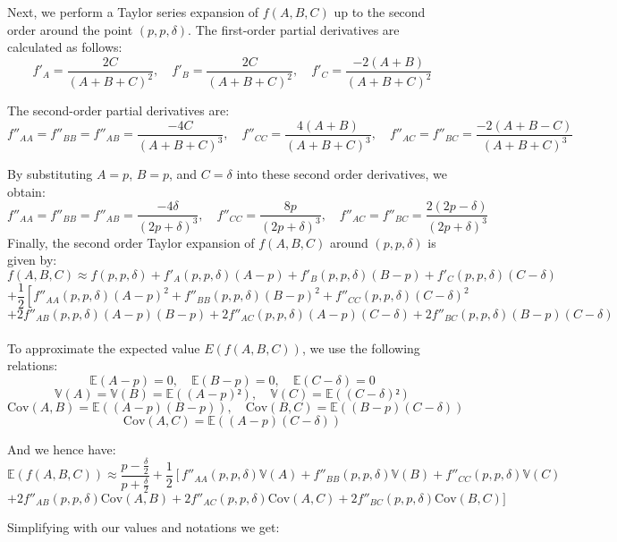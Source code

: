 Next, we perform a Taylor series expansion of \(f(A,B,C)\) up to the second order around the point \((p, p, \delta)\). The first-order partial derivatives are calculated as follows:
\[
f'_A = \frac{2C}{(A + B + C)^2}, \quad f'_B = \frac{2C}{(A + B + C)^2}, \quad f'_C = \frac{-2(A + B)}{(A + B + C)^2}
\]

The second-order partial derivatives are:
\[
f''_{AA} = f''_{BB} = f''_{AB} = \frac{-4C}{(A + B + C)^3}, \quad f''_{CC} = \frac{4(A + B)}{(A + B + C)^3}, \quad f''_{AC} = f''_{BC} = \frac{-2(A + B - C)}{(A + B + C)^3}
\]

By substituting \(A = p\), \(B = p\), and \(C = \delta\) into these second order derivatives, we obtain:
\[
f''_{AA} = f''_{BB} = f''_{AB} = \frac{-4\delta}{(2p + \delta)^3}, \quad f''_{CC} = \frac{8p}{(2p + \delta)^3}, \quad f''_{AC} = f''_{BC} = \frac{2(2p - \delta)}{(2p + \delta)^3}
\]
Finally, the second order Taylor expansion of \(f(A,B,C)\) around \((p,p,\delta)\) is given by:
\[
f(A,B,C) \approx f(p,p,\delta) + f'_A(p,p,\delta)(A - p) + f'_B(p,p,\delta)(B - p) + f'_C(p,p,\delta)(C - \delta)
\]
\[
+ \frac{1}{2} \left[ f''_{AA}(p,p,\delta)(A - p)^2 + f''_{BB}(p,p,\delta)(B - p)^2 + f''_{CC}(p,p,\delta)(C - \delta)^2 \right.
\]
\[
+ 2f''_{AB}(p,p,\delta)(A - p)(B - p) + 2f''_{AC}(p,p,\delta)(A - p)(C - \delta) + 2f''_{BC}(p,p,\delta)(B - p)(C - \delta)
\]\\
To approximate the expected value \( E(f(A,B,C)) \), we use the following relations:
\[
    \mathbb{E}(A - p) = 0, \quad \mathbb{E}(B - p) = 0, \quad \mathbb{E}(C - \delta) = 0
\]
\[
    \mathbb{V}(A) = \mathbb{V}(B) = \mathbb{E}((A - p)²), \quad \mathbb{V}(C) = \mathbb{E}((C - \delta)²)
\]
\[
    \text{Cov}(A, B) = \mathbb{E}((A - p)(B - p)), \quad \text{Cov}(B, C) = \mathbb{E}((B - p)(C - \delta))
\]
\[
    \text{Cov}(A, C) = \mathbb{E}((A - p)(C - \delta))
\]

And we hence have:
\[
    \mathbb{E}(f(A,B,C)) \approx \frac{p - \frac{\delta}{2}}{p + \frac{\delta}{2}} + \frac{1}{2} \left[ f''_{AA}(p,p,\delta)\mathbb{V}(A) + f''_{BB}(p,p,\delta)\mathbb{V}(B) + f''_{CC}(p,p,\delta)\mathbb{V}(C) \right.
\]
\[
+ 2f''_{AB}(p,p,\delta) \text{Cov}(A,B) + 2f''_{AC}(p,p,\delta) \text{Cov}(A,C) + 2f''_{BC}(p,p,\delta) \text{Cov}(B,C)]
\]

Simplifying with our values and notations we get:

